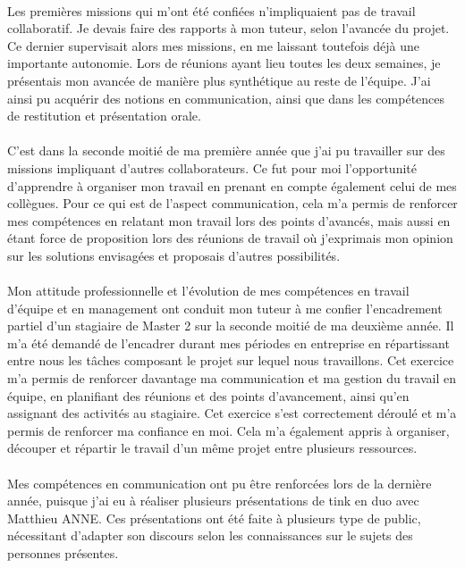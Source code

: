 \documentclass[12pt,a4paper]{report}
\begin{document}
\paragraph*{}Les premières missions qui m'ont été confiées n'impliquaient pas de travail collaboratif. Je devais faire des rapports à mon tuteur, selon l'avancée du projet. Ce dernier supervisait alors mes missions, en me laissant toutefois déjà une importante autonomie. Lors de réunions ayant lieu toutes les deux semaines, je présentais mon avancée de manière plus synthétique au reste de l'équipe. J'ai ainsi pu acquérir des notions en communication, ainsi que dans les compétences de restitution et présentation orale.
\paragraph*{}C'est dans la seconde moitié de ma première année que j'ai pu travailler sur des missions impliquant d'autres collaborateurs. Ce fut pour moi l'opportunité d'apprendre à organiser mon travail en prenant en compte également celui de mes collègues. Pour ce qui est de l'aspect communication, cela m'a permis de renforcer mes compétences en relatant mon travail lors des points d'avancés, mais aussi en étant force de proposition lors des réunions de travail où j'exprimais mon opinion sur les solutions envisagées et proposais d'autres possibilités.
\paragraph*{}Mon attitude professionnelle et l'évolution de mes compétences en travail d'équipe et en  management ont conduit mon tuteur à me confier l'encadrement partiel d'un stagiaire de Master 2 sur la seconde moitié de ma deuxième année. Il m'a été demandé de l'encadrer durant mes périodes en entreprise en répartissant entre nous les tâches composant le projet sur lequel nous travaillons. Cet exercice m'a permis de renforcer davantage ma communication et ma gestion du travail en équipe, en planifiant des réunions et des points d'avancement, ainsi qu'en assignant des activités au stagiaire. Cet exercice s'est correctement déroulé et m'a permis de renforcer ma confiance en moi. Cela m'a également appris à organiser, découper et répartir le travail d'un même projet entre plusieurs ressources.
\paragraph*{}Mes compétences en communication ont pu être renforcées lors de la dernière année, puisque j'ai eu à réaliser plusieurs présentations de \gls{tink} en duo avec Matthieu ANNE. Ces présentations ont été faite à plusieurs type de public, nécessitant d'adapter son discours selon les connaissances sur le sujets des personnes présentes. \\
\end{document}

